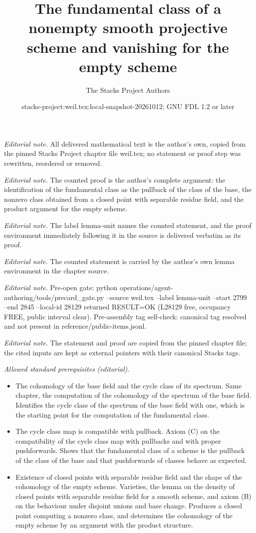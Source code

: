 \documentclass[10pt,a4paper]{amsart}
\title{The fundamental class of a nonempty smooth projective scheme and vanishing for the empty scheme}
\author{The Stacks Project Authors}
\date{stacks-project:weil.tex:local-snapshot-20261012; GNU FDL 1.2 or later}
\theoremstyle{plain}
\theoremstyle{definition}
\theoremstyle{remark}
\numberwithin{equation}{subsection}
\begin{document}
\maketitle
\noindent\textit{Editorial note.} All delivered mathematical text is the author's own, copied from the pinned Stacks Project chapter file weil.tex; no statement or proof step was rewritten, reordered or removed.\par\medskip
\noindent\textit{Editorial note.} The counted proof is the author's complete argument: the identification of the fundamental class as the pullback of the class of the base, the nonzero class obtained from a closed point with separable residue field, and the product argument for the empty scheme.\par\medskip
\noindent\textit{Editorial note.} The label lemma-unit names the counted statement, and the proof environment immediately following it in the source is delivered verbatim as its proof.\par\medskip
\noindent\textit{Editorial note.} The counted statement is carried by the author's own lemma environment in the chapter source.\par\medskip
\noindent\textit{Editorial note.} Pre-open gate: python operations/agent-authoring/tools/precard\_gate.py --source weil.tex --label lemma-unit --start 2799 --end 2845 --local-id 28129 returned RESULT=OK (L28129 free, occupancy FREE, public interval clear). Pre-assembly tag self-check: canonical tag resolved and not present in reference/public-items.jsonl.\par\medskip
\noindent\textit{Editorial note.} The statement and proof are copied from the pinned chapter file; the cited inputs are kept as external pointers with their canonical Stacks tags.\par\medskip
\noindent\textit{Allowed standard prerequisites (editorial).}\begin{itemize}
\item The cohomology of the base field and the cycle class of its spectrum. Same chapter, the computation of the cohomology of the spectrum of the base field. Identifies the cycle class of the spectrum of the base field with one, which is the starting point for the computation of the fundamental class.
\item The cycle class map is compatible with pullback. Axiom (C) on the compatibility of the cycle class map with pullbacks and with proper pushforwards. Shows that the fundamental class of a scheme is the pullback of the class of the base and that pushforwards of classes behave as expected.
\item Existence of closed points with separable residue field and the shape of the cohomology of the empty scheme. Varieties, the lemma on the density of closed points with separable residue field for a smooth scheme, and axiom (B) on the behaviour under disjoint unions and base change. Produces a closed point computing a nonzero class, and determines the cohomology of the empty scheme by an argument with the product structure.
\end{itemize}\medskip
\end{document}
